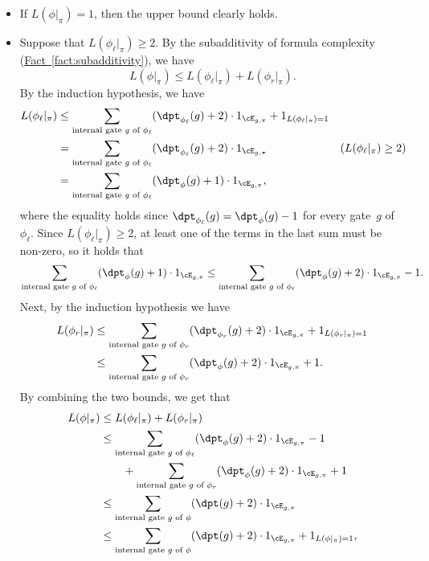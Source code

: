 \documentclass[11pt]{article}
\numberwithin{equation}{section}
\theoremstyle{definition}
\theoremstyle{plain}
\newcommand{\expref}[2]{\hyperref[#2]{#1~\ref{#2}}}
\theoremstyle{definition}\newtheorem{notation}[theorem]{Notation}\theoremstyle{plain}
\begin{document}
\begin{itemize}
\item If $L(\phi|_{\pi})=1$, then the upper bound clearly holds. 
\item Suppose that $L(\phi_{\ell}|_{\pi})\ge2$. By the subadditivity of
formula complexity (\expref{Fact}{fact:subadditivity}), we have 
\[
L(\phi|_{\pi})\le L(\phi_{\ell}|_{\pi})+L(\phi_{r}|_{\pi}).
\]
By the induction hypothesis, we have 
\begin{align*}
L(\phi_{\ell}|_{\pi}) & \le\sum_{\text{internal gate }g\text{ of }\phi_{\ell}}(\dpt_{\phi_{\ell}}(g)+2)\cdot1_{\cE_{g,\pi}}+1_{L(\phi_{\ell}|_{\pi})=1}\\
 & =\sum_{\text{internal gate }g\text{ of }\phi_{\ell}}(\dpt_{\phi_{\ell}}(g)+2)\cdot1_{\cE_{g,\pi}} & (L(\phi_{\ell}|_{\pi})\ge2)\\
 & =\sum_{\text{internal gate }g\text{ of }\phi_{\ell}}(\dpt_{\phi}(g)+1)\cdot1_{\cE_{g,\pi}},
\end{align*}
where the equality holds since $\dpt_{\phi_{\ell}}(g)=\dpt_{\phi}(g)-1$
for every gate~$g$ of $\phi_{\ell}$. Since $L(\phi_{\ell}|_{\pi})\ge2$,
at least one of the terms in the last sum must be non-zero, so it
holds that 
\[
\sum_{\text{internal gate }g\text{ of }\phi_{\ell}}(\dpt_{\phi}(g)+1)\cdot1_{\cE_{g,\pi}}\le\sum_{\text{internal gate }g\text{ of }\phi_{\ell}}(\dpt_{\phi}(g)+2)\cdot1_{\cE_{g,\pi}}-1.
\]
Next, by the induction hypothesis we have 
\begin{align*}
L(\phi_{r}|_{\pi}) & \le\sum_{\text{internal gate }g\text{ of }\phi_{r}}(\dpt_{\phi_{r}}(g)+2)\cdot1_{\cE_{g,\pi}}+1_{L(\phi_{r}|_{\pi})=1}\\
 & \le\sum_{\text{internal gate }g\text{ of }\phi_{r}}(\dpt_{\phi}(g)+2)\cdot1_{\cE_{g,\pi}}+1.
\end{align*}
By combining the two bounds, we get that 
\begin{align*}
L(\phi|_{\pi}) & \le L(\phi_{\ell}|_{\pi})+L(\phi_{r}|_{\pi})\\
 & \le\sum_{\text{internal gate }g\text{ of }\phi_{\ell}}(\dpt_{\phi}(g)+2)\cdot1_{\cE_{g,\pi}}-1\\
 & \qquad+\sum_{\text{internal gate }g\text{ of }\phi_{r}}(\dpt_{\phi}(g)+2)\cdot1_{\cE_{g,\pi}}+1\\
 & \le\sum_{\text{internal gate }g\text{ of }\phi}(\dpt(g)+2)\cdot1_{\cE_{g,\pi}}\\
 & \le\sum_{\text{internal gate }g\text{ of }\phi}(\dpt(g)+2)\cdot1_{\cE_{g,\pi}}+1_{L(\phi|_{\pi})=1},
\end{align*}

\end{itemize}
\end{document}
